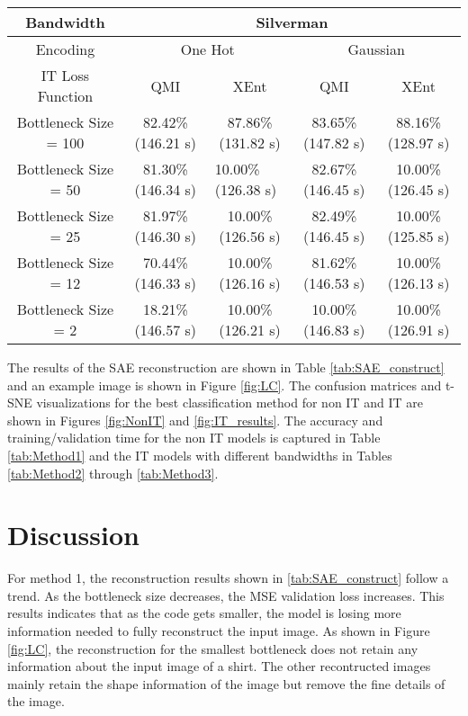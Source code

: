 \documentclass[conference]{IEEEtran}
\begin{document}
\begin{table*}[htb!]
	\centering
	\caption{Testing Accuracy and Training/Validation Computation Time for Methods Using Silverman Bandwidth}
	\begin{tabular}{|c|c|c|c|c|}
		\hline
		Bandwidth             & \multicolumn{4}{c|}{Silverman}                                                                         \\ \hline
		Encoding              & \multicolumn{2}{c|}{One Hot}                                 & \multicolumn{2}{c|}{Gaussian}           \\ \hline
		IT Loss Function      & QMI                & XEnt                                    & QMI                & XEnt               \\ \hline
		Bottleneck Size = 100 & 82.42\% (146.21 s) & 87.86\% (131.82 s)                      & 83.65\% (147.82 s) & 88.16\% (128.97 s) \\ \hline
		Bottleneck Size = 50  & 81.30\% (146.34 s) & \multicolumn{1}{l|}{10.00\% (126.38 s)} & 82.67\% (146.45 s) & 10.00\% (126.45 s) \\ \hline
		Bottleneck Size = 25  & 81.97\% (146.30 s) & 10.00\% (126.56 s)                      & 82.49\% (146.45 s) & 10.00\% (125.85 s) \\ \hline
		Bottleneck Size = 12  & 70.44\% (146.33 s) & 10.00\% (126.16 s)                      & 81.62\% (146.53 s) & 10.00\% (126.13 s) \\ \hline
		Bottleneck Size = 2   & 18.21\% (146.57 s) & 10.00\% (126.21 s)                      & 10.00\% (146.83 s) & 10.00\% (126.91 s) \\ \hline
	\end{tabular}
	\label{tab:Method3}
\end{table*}

The results of the SAE reconstruction are shown in Table \ref{tab:SAE_construct} and an example image is shown in Figure \ref{fig:LC}. The confusion matrices and t-SNE visualizations for the best classification method for non IT and IT are shown in Figures \ref{fig:NonIT} and \ref{fig:IT_results}. The accuracy and training/validation time for the non IT models is captured in Table \ref{tab:Method1} and the IT models with different bandwidths in Tables \ref{tab:Method2} through \ref{tab:Method3}.   


\section{Discussion}
	For method 1, the reconstruction results shown in \ref{tab:SAE_construct} follow a trend. As the bottleneck size decreases, the MSE validation loss increases. This results indicates that as the code gets smaller, the model is losing more information needed to fully reconstruct the input image. As shown in Figure \ref{fig:LC}, the reconstruction for the smallest bottleneck does not retain any information about the input image of a shirt. The other recontructed images mainly retain the shape information of the image but remove the fine details of the image.
	
\end{document}
